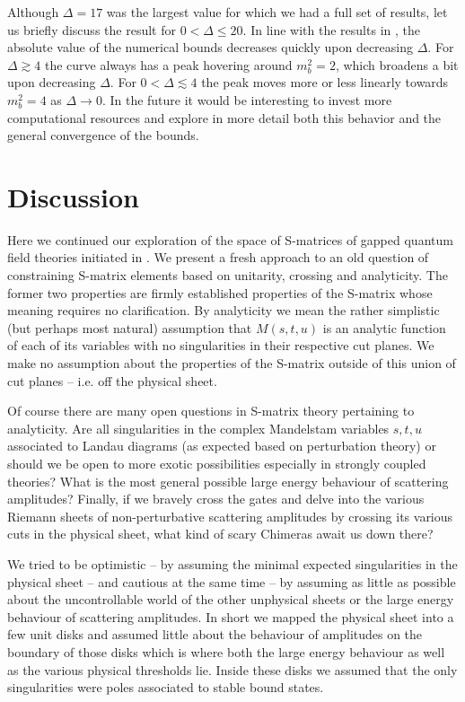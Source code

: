 \documentclass[12pt]{article}
\newcommand{\la}[1]{\label{#1}}
\newcommand{\<}{{\langle}}
\renewcommand{\>}{{\rangle}}
\begin{document}
Although $\Delta = 17$ was the largest value for which we had a full set of results, let us briefly discuss the result for $0 < \Delta \leq 20$. In line with the results in \cite{paperI}, the absolute value of the numerical bounds decreases quickly upon decreasing $\Delta$. For $\Delta \gtrsim 4$ the curve always has a peak hovering around $m_b^2 = 2$, which broadens a bit upon decreasing $\Delta$. For $0 < \Delta \lesssim 4$ the peak moves more or less linearly towards $m_b^2 = 4$ as $\Delta \to 0$. In the future it would be interesting to invest more computational resources and explore in more detail both this behavior and the general convergence of the bounds.

\section{Discussion} \la{secConc}
Here we continued our exploration of the space of S-matrices of gapped quantum field theories initiated in \cite{paperI,paperII}.  We present a fresh approach to an old question of constraining S-matrix elements based on unitarity, crossing and analyticity.  The former two properties are firmly established properties of the S-matrix whose meaning requires no clarification.  By analyticity we mean the rather simplistic (but perhaps most natural) assumption that $M(s,t,u)$ is an analytic function of each of its variables with no singularities in their respective cut planes.  We make no assumption about the properties of the S-matrix outside of this union of cut planes -- i.e. off the physical sheet.

Of course there are many open questions in S-matrix theory pertaining to analyticity.   Are all singularities in the complex Mandelstam variables $s,t,u$ associated to Landau diagrams (as expected based on perturbation theory) or should we be open to more exotic possibilities especially in strongly coupled theories? What is the most general possible large energy behaviour of scattering amplitudes?  Finally, if we bravely cross the gates and delve  into the various Riemann sheets of non-perturbative scattering amplitudes by crossing its various cuts in the physical sheet, what kind of scary Chimeras await us down there? 

We tried to be optimistic -- by assuming the minimal expected singularities in the physical sheet -- and cautious at the same time  -- by assuming as little as possible about the uncontrollable world of the other unphysical sheets or the large energy behaviour of scattering amplitudes. In short we mapped the physical sheet into a few  unit disks and assumed little about the behaviour of amplitudes on the boundary of those disks which is where both the  large energy behaviour as well as the various physical thresholds lie. Inside these disks we assumed that the only singularities were poles associated to stable bound states. 
\end{document}
